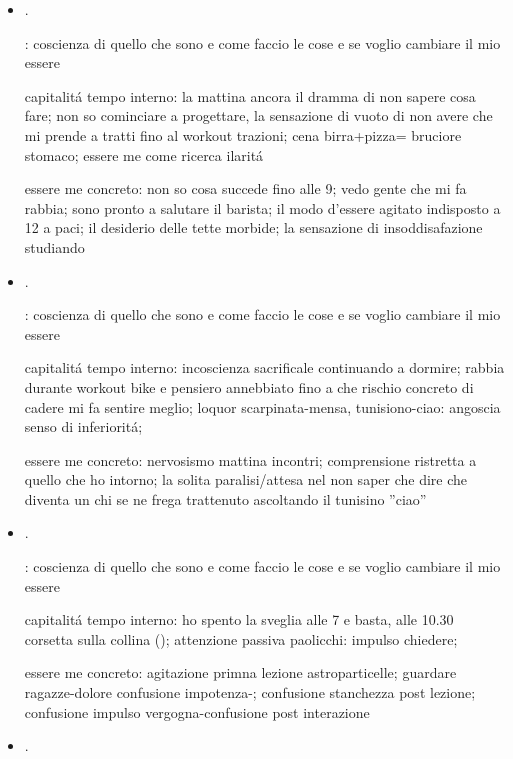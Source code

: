 \begin{itemize}
\item {}.

: coscienza di quello che sono e come faccio le cose e se voglio cambiare il mio essere

capitalit\'a tempo interno:  la mattina ancora il dramma di non sapere cosa fare; non so cominciare a progettare, la sensazione di vuoto di non avere che mi prende a tratti fino al workout trazioni; cena birra+pizza= bruciore stomaco; essere me come ricerca ilarit\'a

essere me concreto: non so cosa succede fino alle 9; vedo gente che mi fa rabbia; sono pronto a salutare il barista; il modo d'essere agitato indisposto a 12 a paci; il desiderio delle tette morbide; la sensazione di insoddisafazione studiando

\item {}.

: coscienza di quello che sono e come faccio le cose e se voglio cambiare il mio essere

capitalit\'a tempo interno: incoscienza sacrificale continuando a dormire; rabbia durante workout bike e pensiero annebbiato fino a che rischio concreto di cadere mi fa sentire meglio; loquor scarpinata-mensa, tunisiono-ciao: angoscia senso di inferiorit\'a;

essere me concreto: nervosismo mattina incontri; comprensione ristretta a quello che ho intorno; la solita paralisi/attesa nel non saper che dire che diventa un chi se ne frega trattenuto ascoltando il tunisino ''ciao''

\item {}.

: coscienza di quello che sono e come faccio le cose e se voglio cambiare il mio essere

capitalit\'a tempo interno: ho spento la sveglia alle 7 e basta, alle 10.30 corsetta sulla collina (); attenzione passiva paolicchi: impulso chiedere; 

essere me concreto: agitazione primna lezione astroparticelle; guardare ragazze-dolore confusione impotenza-; confusione stanchezza post lezione; confusione impulso vergogna-confusione post interazione

\item {}.


\end{itemize}
